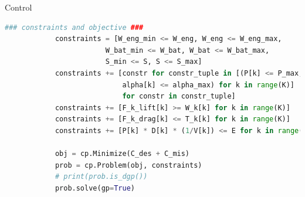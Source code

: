 \begin{chapter}{Control}
\begin{algorithm}[H]
\begin{lstlisting}[language=Python]
            ### constraints and objective ###
            constraints = [W_eng_min <= W_eng, W_eng <= W_eng_max,
                        W_bat_min <= W_bat, W_bat <= W_bat_max,
                        S_min <= S, S <= S_max]
            constraints += [constr for constr_tuple in [(P[k] <= P_max,
                            alpha[k] <= alpha_max) for k in range(K)]
                            for constr in constr_tuple]
            constraints += [F_k_lift[k] >= W_k[k] for k in range(K)]
            constraints += [F_k_drag[k] <= T_k[k] for k in range(K)]
            constraints += [P[k] * D[k] * (1/V[k]) <= E for k in range(K)]
            
            obj = cp.Minimize(C_des + C_mis)
            prob = cp.Problem(obj, constraints)
            # print(prob.is_dgp())
            prob.solve(gp=True)
            \end{lstlisting}
        \label{alg:uav_code}
    \end{algorithm}






\end{chapter}
